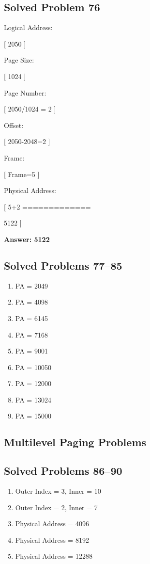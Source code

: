 \subsection{Solved Problem 76}

Logical Address:

[
2050
]

Page Size:

[
1024
]

Page Number:

[
2050/1024 = 2
]

Offset:

[
2050-2048=2
]

Frame:

[
Frame=5
]

Physical Address:

[
5+2
=============

5122
]

\textbf{Answer: 5122}

\subsection{Solved Problems 77--85}

\begin{enumerate}
\item PA = 2049
\item PA = 4098
\item PA = 6145
\item PA = 7168
\item PA = 9001
\item PA = 10050
\item PA = 12000
\item PA = 13024
\item PA = 15000
\end{enumerate}

\subsection{Multilevel Paging Problems}

\subsection{Solved Problems 86--90}

\begin{enumerate}
\item Outer Index = 3, Inner = 10
\item Outer Index = 2, Inner = 7
\item Physical Address = 4096
\item Physical Address = 8192
\item Physical Address = 12288
\end{enumerate}

